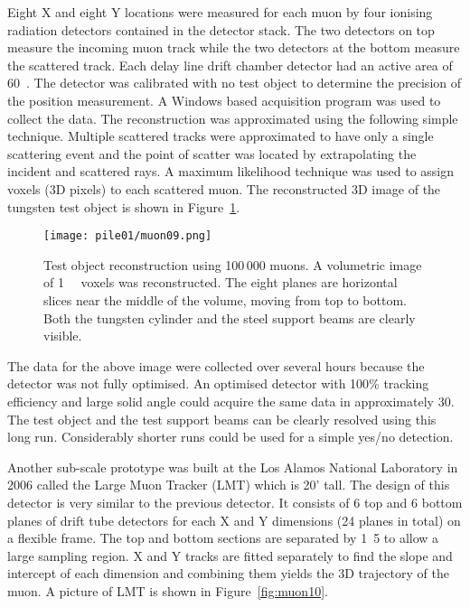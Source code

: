 \documentclass[twoside,titlepage,11pt,twocolumn,a4paper]{article}
\begin{document}
Eight X and eight Y locations were measured for each muon by four
ionising radiation detectors contained in the detector stack. The two
detectors on top measure the incoming muon track while the two
detectors at the bottom measure the scattered track. Each delay line
drift chamber detector had an active area of
\unit{60}{\square{\centi\metre}}. The detector was calibrated
with no test object to determine the precision of the position
measurement. A Windows based acquisition program was used to collect
the data. The reconstruction was approximated using the following
simple technique. Multiple scattered tracks were approximated to have
only a single scattering event and the point of scatter was located by
extrapolating the incident and scattered rays. A maximum likelihood
technique was used to assign voxels (3D pixels) to each scattered
muon. The reconstructed 3D image of the tungsten test object is shown
in Figure~\ref{fig:muon09}. \citep{Priedhorsky2003}

\begin{figure}
  \texttt{[image: pile01/muon09.png]}
  \caption{Test object reconstruction using 100\,000 muons. A
    volumetric image of \unit{1}{\cubic{\centi\metre}}
    voxels was reconstructed. The eight planes are horizontal slices
    near the middle of the volume, moving from top to bottom. Both the
    tungsten cylinder and the steel support beams are clearly
    visible. \citep{Priedhorsky2003}}
  \label{fig:muon09}
\end{figure}

The data for the above image were collected over several hours because
the detector was not fully optimised. An optimised detector with 100\%
tracking efficiency and large solid angle could acquire the same data
in approximately \unit{30}{\minute}. The test object and the test
support beams can be clearly resolved using this long
run. Considerably shorter runs could be used for a simple yes/no
detection. \citep{Priedhorsky2003}

Another sub-scale prototype was built at the Los Alamos National
Laboratory in 2006 called the Large Muon Tracker (LMT) which is 20'
tall. The design of this detector is very similar to the previous
detector. It consists of 6 top and 6 bottom planes of drift tube
detectors for each X and Y dimensions (24 planes in total) on a
flexible frame. The top and bottom sections are separated by
\unit{1.5}{\metre} to allow a large sampling region. X and Y tracks
are fitted separately to find the slope and intercept of each
dimension and combining them yields the 3D trajectory of the muon. A
picture of LMT is shown in Figure~\ref{fig:muon10}. \citep{green2006}
\end{document}
